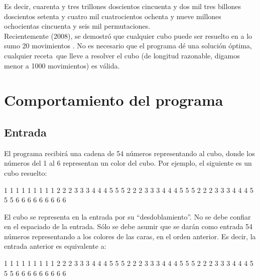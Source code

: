 \documentclass[11pt,a4paper]{article}
\begin{document}
Es decir, cuarenta y tres trillones doscientos cincuenta y dos mil tres billones doscientos setenta y cuatro mil cuatrocientos ochenta y nueve millones ochocientas cincuenta y seis mil permutaciones.\\

Recientemente (2008), se demostró que cualquier cubo puede ser resuelto en a lo sumo 20 movimientos \cite{movs}. No es necesario que el programa dé una solución óptima, cualquier receta\footnotemark  \, que lleve a resolver el cubo (de longitud razonable, digamos menor a 1000 movimientos) es válida.


\section{Comportamiento del programa}

\subsection{Entrada}
El programa recibirá una cadena de 54 números representando al cubo, donde los números del 1 al 6 representan un color del cubo. Por ejemplo, el siguiente es un cubo resuelto: \\
\begin{center}
\begin{verbbox}
      1 1 1 
      1 1 1 
      1 1 1 
2 2 2 3 3 3 4 4 4 5 5 5 
2 2 2 3 3 3 4 4 4 5 5 5 
2 2 2 3 3 3 4 4 4 5 5 5
      6 6 6 
      6 6 6 
      6 6 6 
\end{verbbox}

\theverbbox
\end{center}

El cubo se representa en la entrada por su ``desdoblamiento''. No se debe confiar en el espaciado de la entrada. Sólo se debe asumir que se darán como entrada 54 números representando a los colores de las caras, en el orden anterior. Es decir, la entrada anterior es equivalente a:

\begin{center}
\begin{verbbox}
1 1 1 1 1 1 1 1 1 2 2 2 3 3 3 4 4 4 5 5 5 2 2 2 3 3 3
4 4 4 5 5 5 2 2 2 3 3 3 4 4 4 5 5 5 6 6 6 6 6 6 6 6 6 
\end{verbbox}

\theverbbox
\end{center}
\end{document}

